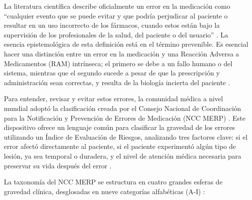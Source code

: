 La literatura científica describe oficialmente un error en la medicación como “cualquier evento que se puede evitar y que podría perjudicar al paciente o resultar en un uso incorrecto de los fármacos, cuando estos están bajo la supervisión de los profesionales de la salud, del paciente o del usuario” \cite{msp_uruguay_errores}. La esencia epistemológica de esta definición está en el término prevenible. Es esencial hacer una distinción entre un error en la medicación y una Reacción Adversa a Medicamentos (RAM) intrínseca; el primero se debe a un fallo humano o del sistema, mientras que el segundo sucede a pesar de que la prescripción y administración sean correctas, y resulta de la biología incierta del paciente \cite{sefh_cap214_errores}.

Para entender, revisar y evitar estos errores, la comunidad médica a nivel mundial adoptó la clasificación creada por el Consejo Nacional de Coordinación para la Notificación y Prevención de Errores de Medicación (NCC MERP) \cite{ilaphar2024errores}. Este dispositivo ofrece un lenguaje común para clasificar la gravedad de los errores utilizando un Índice de Evaluación de Riesgos, analizando tres factores clave: si el error afectó directamente al paciente, si el paciente experimentó algún tipo de lesión, ya sea temporal o duradera, y el nivel de atención médica necesaria para preservar su vida después del error \cite{sefh_cap214_errores}.

La taxonomía del NCC MERP se estructura en cuatro grandes esferas de gravedad clínica, desglosadas en nueve categorías alfabéticas (A-I) \cite{sefh_cap214_errores}:

